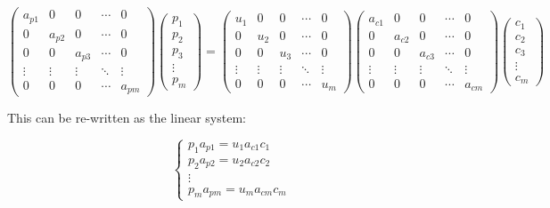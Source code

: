 \begin{equation}
\begin{pmatrix}
  a_{p1} & 0 & 0 & \cdots & 0 \\
  0 & a_{p2} & 0& \cdots & 0 \\
  0 & 0 & a_{p3} & \cdots & 0 \\
  \vdots  & \vdots  & \vdots & \ddots & \vdots  \\
  0 & 0 & 0& \cdots & a_{pm} 
 \end{pmatrix}
 \begin{pmatrix}
  p_{1}  \\
  p_{2}  \\
  p_{3}  \\
  \vdots  \\
  p_{m}  
 \end{pmatrix}
=
\begin{pmatrix}
  u_{1} & 0 & 0 & \cdots & 0 \\
  0 & u_{2} & 0& \cdots & 0 \\
  0 & 0 & u_{3} & \cdots & 0 \\
  \vdots  & \vdots  & \vdots & \ddots & \vdots  \\
  0 & 0 & 0& \cdots & u_{m} 
 \end{pmatrix}
\begin{pmatrix}
  a_{c1} & 0 & 0 & \cdots & 0 \\
  0 & a_{c2} & 0& \cdots & 0 \\
  0 & 0 & a_{c3} & \cdots & 0 \\
  \vdots  & \vdots  & \vdots & \ddots & \vdots  \\
  0 & 0 & 0& \cdots & a_{cm} 
 \end{pmatrix}
\begin{pmatrix}
  c_{1}  \\
  c_{2}  \\
  c_{3}  \\
  \vdots  \\
  c_{m}  
 \end{pmatrix}
\end{equation}


This can be re-written as the linear system:

\begin{equation}
 \begin{cases} 
 p_1 a_{p1}=u_1 a_{c1} c_1 \\
p_2 a_{p2}=u_2 a_{c2} c_2 \\
\vdots \\
p_m a_{pm}=u_m a_{cm} c_m
\end{cases}
\label{eq:solvable}
\end{equation}

